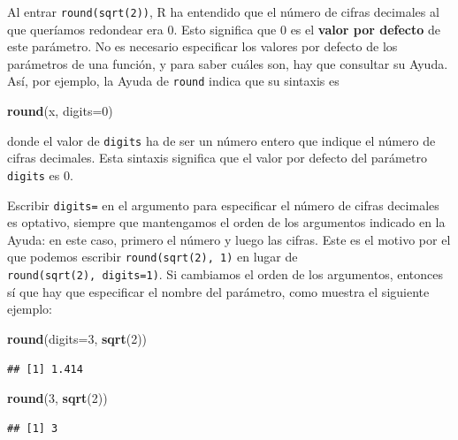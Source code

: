 \documentclass[]{book}
\newenvironment{Shaded}{\begin{snugshade}}{\end{snugshade}}
\newcommand{\DataTypeTok}[1]{\textcolor[rgb]{0.13,0.29,0.53}{#1}}
\newcommand{\DecValTok}[1]{\textcolor[rgb]{0.00,0.00,0.81}{#1}}
\newcommand{\KeywordTok}[1]{\textcolor[rgb]{0.13,0.29,0.53}{\textbf{#1}}}
\newcommand{\NormalTok}[1]{#1}
\theoremstyle{definition}
\theoremstyle{definition}
\theoremstyle{definition}
\theoremstyle{remark}
\begin{document}
Al entrar \texttt{round(sqrt(2))}, R ha entendido que el número de cifras decimales al que queríamos redondear era 0. Esto significa que 0 es el \textbf{valor por defecto} de este parámetro. No es necesario especificar los valores por defecto de los parámetros de una función, y para saber cuáles son, hay que consultar su Ayuda. Así, por ejemplo, la Ayuda de \texttt{round} indica que su sintaxis es

\begin{Shaded}
\begin{Highlighting}[]
\KeywordTok{round}\NormalTok{(x, }\DataTypeTok{digits=}\DecValTok{0}\NormalTok{)}
\end{Highlighting}
\end{Shaded}

donde el valor de \texttt{digits} ha de ser un número entero que indique el número de cifras decimales. Esta sintaxis significa que el valor por defecto del parámetro \texttt{digits} es 0.

Escribir \texttt{digits=} en el argumento para especificar el número de cifras decimales es optativo, siempre que mantengamos el orden de los argumentos indicado en la Ayuda: en este caso, primero el número y luego las cifras. Este es el motivo por el que podemos escribir
\texttt{round(sqrt(2),\ 1)} en lugar de \texttt{round(sqrt(2),\ digits=1)}. Si cambiamos el orden de los argumentos, entonces sí que hay que especificar el nombre del parámetro, como muestra el siguiente ejemplo:

\begin{Shaded}
\begin{Highlighting}[]
\KeywordTok{round}\NormalTok{(}\DataTypeTok{digits=}\DecValTok{3}\NormalTok{, }\KeywordTok{sqrt}\NormalTok{(}\DecValTok{2}\NormalTok{))}
\end{Highlighting}
\end{Shaded}

\begin{verbatim}
## [1] 1.414
\end{verbatim}

\begin{Shaded}
\begin{Highlighting}[]
\KeywordTok{round}\NormalTok{(}\DecValTok{3}\NormalTok{, }\KeywordTok{sqrt}\NormalTok{(}\DecValTok{2}\NormalTok{))}
\end{Highlighting}
\end{Shaded}

\begin{verbatim}
## [1] 3
\end{verbatim}
\end{document}
